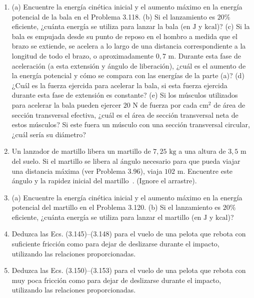 \documentclass[12pt]{book}
\begin{document}
\begin{enumerate}
\item[3.119] (a) Encuentre la energía cinética inicial y el aumento máximo en la energía potencial de la bala en el Problema 3.118.
\newline
(b) Si el lanzamiento es $20\%$ eficiente, ¿cuánta energía se utiliza para lanzar la bala (en $\text{J}$ y $\text{kcal}$)?
\newline
(c) Si la bala es empujada desde su punto de reposo en el hombro a medida que el brazo se extiende, se acelera a lo largo de una distancia correspondiente a la longitud de todo el brazo, o aproximadamente $0{,}7\text{ m}$. Durante esta fase de aceleración (a esta extensión y ángulo de liberación), ¿cuál es el aumento de la energía potencial y cómo se compara con las energías de la parte (a)?
\newline
(d) ¿Cuál es la fuerza ejercida para acelerar la bala, si esta fuerza ejercida durante esta fase de extensión es constante?
\newline
(e) Si los músculos utilizados para acelerar la bala pueden ejercer $20\text{ N}$ de fuerza por cada $\text{cm}^2$ de área de sección transversal efectiva, ¿cuál es el área de sección transversal neta de estos músculos? Si este fuera un músculo con una sección transversal circular, ¿cuál sería su diámetro?

\item[3.120] Un lanzador de martillo libera un martillo de $7{,}25\text{ kg}$ a una altura de $3{,}5\text{ m}$ del suelo. Si el martillo se libera al ángulo necesario para que pueda viajar una distancia máxima (ver Problema 3.96), viaja $102\text{ m}$. Encuentre este ángulo y la rapidez inicial del martillo~\cite{ref90}. (Ignore el arrastre).

\item[3.121] (a) Encuentre la energía cinética inicial y el aumento máximo en la energía potencial del martillo en el Problema 3.120.
\newline
(b) Si el lanzamiento es $20\%$ eficiente, ¿cuánta energía se utiliza para lanzar el martillo (en $\text{J}$ y $\text{kcal}$)?

\item[3.122] Deduzca las Ecs. (3.145)--(3.148) para el vuelo de una pelota que rebota con suficiente fricción como para dejar de deslizarse durante el impacto, utilizando las relaciones proporcionadas.

\item[3.123] Deduzca las Ecs. (3.150)--(3.153) para el vuelo de una pelota que rebota con muy poca fricción como para dejar de deslizarse durante el impacto, utilizando las relaciones proporcionadas.


\end{enumerate}
\end{document}
